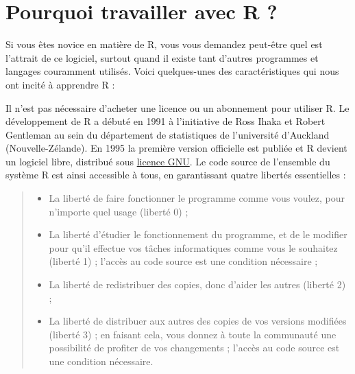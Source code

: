 \documentclass[
  french,
]{scrbook}
\providecommand{\tightlist}{%
  \setlength{\itemsep}{0pt}\setlength{\parskip}{0pt}}
\begin{document}
\hypertarget{pourquoi-travailler-avec-r}{%
\section*{Pourquoi travailler avec R ?}\label{pourquoi-travailler-avec-r}}

Si vous êtes novice en matière de R, vous vous demandez peut-être quel est l'attrait de ce logiciel, surtout quand il existe tant d'autres programmes et langages couramment utilisés. Voici quelques-unes des caractéristiques qui nous ont incité à apprendre R :

\begin{description}
\tightlist
\item[R est libre et gratuit]
Il n'est pas nécessaire d'acheter une licence ou un abonnement pour utiliser R. Le développement de R a débuté en 1991 à l'initiative de Ross Ihaka et Robert Gentleman au sein du département de statistiques de l'université d'Auckland (Nouvelle-Zélande). En 1995 la première version officielle est publiée et R devient un logiciel libre, distribué sous \href{https://www.gnu.org/philosophy/free-sw.html}{licence GNU}. Le code source de l'ensemble du système R est ainsi accessible à tous, en garantissant quatre libertés essentielles :
\end{description}

\begin{quote}
\begin{itemize}
\tightlist
\item
  La liberté de faire fonctionner le programme comme vous voulez, pour n'importe quel usage (liberté 0) ;
\item
  La liberté d'étudier le fonctionnement du programme, et de le modifier pour qu'il effectue vos tâches informatiques comme vous le souhaitez (liberté 1) ; l'accès au code source est une condition nécessaire ;
\item
  La liberté de redistribuer des copies, donc d'aider les autres (liberté 2) ;
\item
  La liberté de distribuer aux autres des copies de vos versions modifiées (liberté 3) ; en faisant cela, vous donnez à toute la communauté une possibilité de profiter de vos changements ; l'accès au code source est une condition nécessaire.
\end{itemize}
\end{quote}
\end{document}
